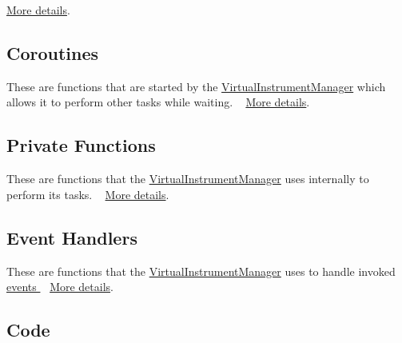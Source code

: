  \hyperlink{group___v_i_m_pub_func}{More details}.\hypertarget{group___v_i_m_DocVIMCoroutines}{}\subsection{Coroutines}\label{group___v_i_m_DocVIMCoroutines}
These are functions that are started by the \hyperlink{class_virtual_instrument_manager}{Virtual\+Instrument\+Manager} which allows it to perform other tasks while waiting. ~\newline
 \hyperlink{group___v_i_m_coroutines}{More details}.\hypertarget{group___v_i_m_DocVIMPrivFunc}{}\subsection{Private Functions}\label{group___v_i_m_DocVIMPrivFunc}
These are functions that the \hyperlink{class_virtual_instrument_manager}{Virtual\+Instrument\+Manager} uses internally to perform its tasks. ~\newline
 \hyperlink{group___v_i_m_priv_func}{More details}.\hypertarget{group___v_i_m_DocVIMHandlers}{}\subsection{Event Handlers}\label{group___v_i_m_DocVIMHandlers}
These are functions that the \hyperlink{class_virtual_instrument_manager}{Virtual\+Instrument\+Manager} uses to handle invoked \hyperlink{group___v_i_m_events}{events } ~\newline
 \hyperlink{group___v_i_m_handlers}{More details}.\hypertarget{group___v_i_m_DocVIMCode}{}\subsection{Code}\label{group___v_i_m_DocVIMCode}

